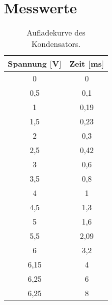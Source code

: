 \section{Messwerte}

\begin{table}
    \centering
    \caption{Aufladekurve des Kondensators.}
    \label{tab:a)}

    \begin{tabular}{c c}
    \toprule
    Spannung [V] & Zeit [ms] \\
    \midrule
      0     &  0   \\    
      0,5   &  0,1 \\    
      1     &  0,19\\    
      1,5   &  0,23\\    
      2     &  0,3 \\    
      2,5   &  0,42\\    
      3     &  0,6 \\    
      3,5   &  0,8 \\    
      4     &  1   \\    
      4,5   &  1,3 \\    
      5     &  1,6 \\    
      5,5   &  2,09\\    
      6     &  3,2 \\    
      6,15  &  4   \\    
      6,25  &  6   \\    
      6,25  &  8   \\
    \bottomrule

    \end{tabular}
\end{table}


